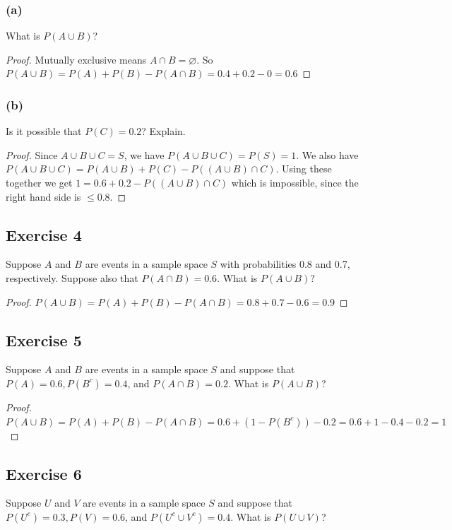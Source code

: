 \documentclass[14pt]{extarticle}
\newcommand{\es}{\varnothing}
\begin{document}
\subsubsection{(a)}
What is \(P(A \cup B)\)?
\begin{proof}
Mutually exclusive means \(A \cap B = \es\). So \(P(A \cup B) = P(A) + P(B) - P(A \cap B) = 0.4+0.2-0 = 0.6\)
\end{proof}

\subsubsection{(b)}
Is it possible that \(P(C) = 0.2\)? Explain.
\begin{proof}
Since \(A \cup B \cup C = S\), we have \(P(A \cup B \cup C) = P(S) = 1\). We also have \(P(A \cup B \cup C) = P(A \cup B) + 
P(C) - P((A \cup B) \cap C)\). Using these together we get \(1 = 0.6 + 0.2 - P((A \cup B) \cap C)\) which is impossible, 
since the right hand side is \(\leq 0.8\).
\end{proof}

\subsection{Exercise 4}
Suppose \(A\) and \(B\) are events in a sample space \(S\) with probabilities 0.8 and 0.7, respectively. Suppose also 
that \(P(A \cap B) = 0.6\). What is \(P(A \cup B)\)?

\begin{proof}
\(P(A \cup B) = P(A) + P(B) - P(A \cap B) = 0.8+0.7-0.6 = 0.9\)
\end{proof}

\subsection{Exercise 5}
Suppose \(A\) and \(B\) are events in a sample space \(S\) and suppose that \(P(A) = 0.6, P(B^c) = 0.4\), and \(P(A \cap B)
= 0.2\). What is \(P(A \cup B)\)?

\begin{proof}
\(P(A \cup B) = P(A) + P(B) - P(A \cap B) = 0.6 + (1-P(B^c)) - 0.2 = 0.6 + 1 - 0.4 - 0.2 = 1\)
\end{proof}

\subsection{Exercise 6}
Suppose \(U\) and \(V\) are events in a sample space \(S\) and suppose that \(P(U^c) = 0.3, P(V) = 0.6\), and \(P(U^c \cup 
V^c) = 0.4\). What is \(P(U \cup V)\)?
\end{document}

